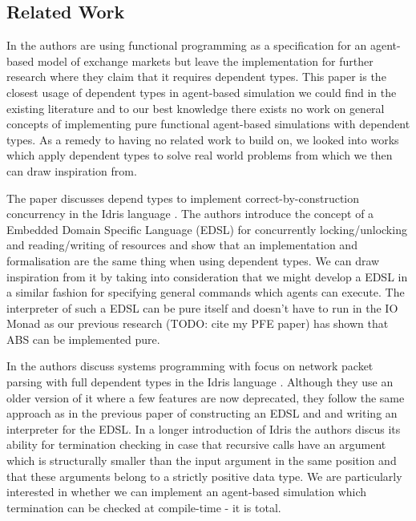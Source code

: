 \subsection{Related Work}
\label{sub:dep_abs_relwork}
In \cite{botta_functional_2011} the authors are using functional programming as a specification for an agent-based model of exchange markets but leave the implementation for further research where they claim that it requires dependent types. This paper is the closest usage of dependent types in agent-based simulation we could find in the existing literature and to our best knowledge there exists no work on general concepts of implementing pure functional agent-based simulations with dependent types. As a remedy to having no related work to build on, we looked into works which apply dependent types to solve real world problems from which we then can draw inspiration from. 

The paper \cite{brady_correct-by-construction_2010} discusses depend types to implement correct-by-construction concurrency in the Idris language \cite{brady_idris_2013}. The authors introduce the concept of a Embedded Domain Specific Language (EDSL) for concurrently locking/unlocking and reading/writing of resources and show that an implementation and formalisation are the same thing when using dependent types. We can draw inspiration from it by taking into consideration that we might develop a EDSL in a similar fashion for specifying general commands which agents can execute. The interpreter of such a EDSL can be pure itself and doesn't have to run in the IO Monad as our previous research (TODO: cite my PFE paper) has shown that ABS can be implemented pure.

In \cite{brady_idris_2011} the authors discuss systems programming with focus on network packet parsing with full dependent types in the Idris language \cite{brady_idris_2013}. Although they use an older version of it where a few features are now deprecated, they follow the same approach as in the previous paper of constructing an EDSL and and writing an interpreter for the EDSL. In a longer introduction of Idris the authors discus its ability for termination checking in case that recursive calls have an argument which is structurally smaller than the input argument in the same position and that these arguments belong to a strictly positive data type. We are particularly interested in whether we can implement an agent-based simulation which termination can be checked at compile-time - it is total.

